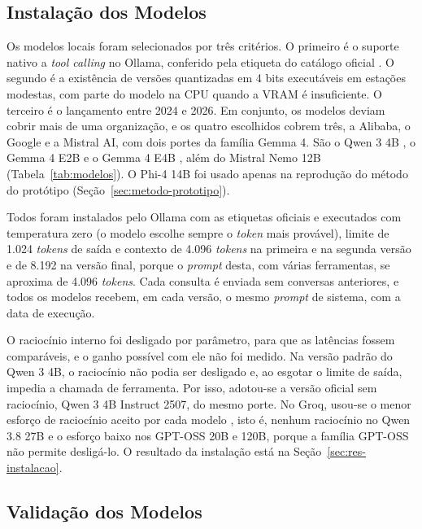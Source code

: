 \subsection{Instalação dos Modelos}
\label{sec:instalacao}

Os modelos locais foram selecionados por três critérios. O primeiro é o suporte nativo a \textit{tool calling} no Ollama, conferido pela etiqueta do catálogo oficial \cite{ollama2023}. O segundo é a existência de versões quantizadas em 4 bits executáveis em estações modestas, com parte do modelo na CPU quando a VRAM é insuficiente. O terceiro é o lançamento entre 2024 e 2026. Em conjunto, os modelos deviam cobrir mais de uma organização, e os quatro escolhidos cobrem três, a Alibaba, o Google e a Mistral AI, com dois portes da família Gemma 4. São o Qwen 3 4B \cite{qwen2025qwen34binstruct2507}, o Gemma 4 E2B e o Gemma 4 E4B \cite{team2026gemma4}, além do Mistral Nemo 12B \cite{mistral2024nemo} (Tabela~\ref{tab:modelos}). O Phi-4 14B \cite{abdin2024phi4} foi usado apenas na reprodução do método do protótipo (Seção~\ref{sec:metodo-prototipo}).

Todos foram instalados pelo Ollama com as etiquetas oficiais e executados com temperatura zero (o modelo escolhe sempre o \textit{token} mais provável), limite de 1.024 \textit{tokens} de saída e contexto de 4.096 \textit{tokens} na primeira e na segunda versão e de 8.192 na versão final, porque o \textit{prompt} desta, com várias ferramentas, se aproxima de 4.096 \textit{tokens}. Cada consulta é enviada sem conversas anteriores, e todos os modelos recebem, em cada versão, o mesmo \textit{prompt} de sistema, com a data de execução.

O raciocínio interno foi desligado por parâmetro, para que as latências fossem comparáveis, e o ganho possível com ele não foi medido. Na versão padrão do Qwen 3 4B, o raciocínio não podia ser desligado e, ao esgotar o limite de saída, impedia a chamada de ferramenta. Por isso, adotou-se a versão oficial sem raciocínio, Qwen 3 4B Instruct 2507, do mesmo porte. No Groq, usou-se o menor esforço de raciocínio aceito por cada modelo \cite{groq2026reasoning}, isto é, nenhum raciocínio no Qwen 3.8 27B e o esforço baixo nos GPT-OSS 20B e 120B, porque a família GPT-OSS não permite desligá-lo. O resultado da instalação está na Seção~\ref{sec:res-instalacao}.

\subsection{Validação dos Modelos}
\label{sec:validacao}


